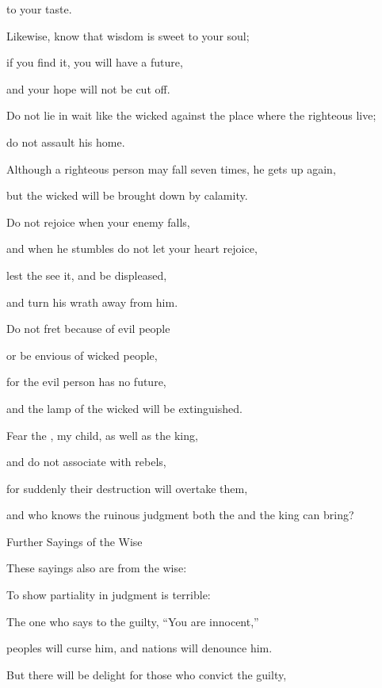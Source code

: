 {to your taste.
\par }{\Q {}Likewise,
know
that wisdom
is sweet to your soul;
\par }{\Q if
you find
it, you will have a future,
\par }{\Q and your hope
will not
be cut off.
\par }{\Q {}Do not
lie in wait
like the wicked
against the place
where the righteous
live;
\par }{\Q do not
assault
his home.
\par }{\Q {}Although
a righteous
person may fall
seven
times, he gets up again,
\par }{\Q but the wicked
will be brought down
by calamity.
\par }{\Q {}Do not
rejoice
when your enemy
falls,
\par }{\Q and when he stumbles
do not
let
your heart
rejoice,
\par }{\Q {}lest
the
{}
see
it, and be displeased,
\par }{\Q and turn
his wrath
away from him.
\par }{\Q {}Do not
fret
because of evil
people
\par }{\Q or
be envious
of wicked people,
\par }{\Q {}for
the evil
person has no
future,
\par }{\Q and the lamp
of the wicked
will be extinguished.
\par }{\Q {}Fear
the {}, my child,
as well as the king,
\par }{\Q and do not
associate
with
rebels,
\par }{\Q {}for
suddenly
their destruction
will overtake them,

\par }{\Q and who
knows
the ruinous
judgment both
the
{} and the king can bring?
\par }{\SH Further Sayings of the Wise
\par }{\Q {}These
sayings also
are from the wise:
\par }{\Q To show partiality
in judgment
is terrible:
\par }{\Q {}The one who says
to the guilty, “You
are innocent,”
\par }{\Q peoples
will curse
him, and nations
will denounce him.
\par }{\Q {}But
there will be delight for those who convict
the guilty,

}
